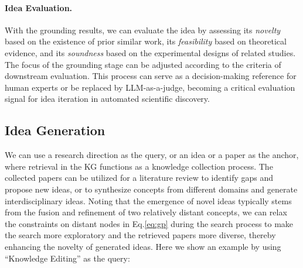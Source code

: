 \documentclass{llmxive}
\begin{document}
\paragraph{Idea Evaluation.}
With the grounding results, we can evaluate the idea by assessing its \textit{novelty} based on the existence of prior similar work, its \textit{feasibility} based on theoretical evidence, and its \textit{soundness} based on the experimental designs of related studies.
The focus of the grounding stage can be adjusted according to the criteria of downstream evaluation.
This process can serve as a decision-making reference for human experts or be replaced by LLM-as-a-judge, becoming a critical evaluation signal for idea iteration in automated scientific discovery.

\subsection{Idea Generation}
We can use a research direction as the query, or an idea or a paper as the anchor, where retrieval in the KG functions as a knowledge collection process.
The collected papers can be utilized for a literature review to identify gaps and propose new ideas, or to synthesize concepts from different domains and generate interdisciplinary ideas.
Noting that the emergence of novel ideas typically stems from the fusion and refinement of two relatively distant concepts, we can relax the constraints on distant nodes in Eq.\ref{eq:gp} during the search process to make the search more exploratory and the retrieved papers more diverse, thereby enhancing the novelty of generated ideas.
Here we show an example by using ``Knowledge Editing'' as the query:
\end{document}
